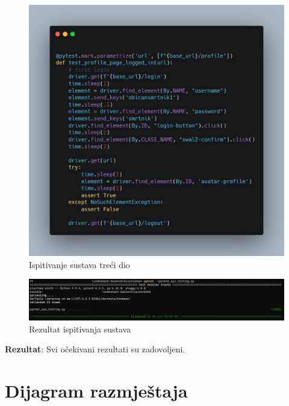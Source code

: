 			\begin{figure}[H]
				\includegraphics[width=\textwidth]{slike/IspitivanjeSustavaTreciDio.png} %
				\caption{Ispitivanje sustava treći dio}
				\label{fig:IspitivanjeSustavaTrećoDio} %
			\end{figure}
			
			\begin{figure}[H]
				\includegraphics[width=\textwidth]{slike/IspitivanjeSustavaRez.png} %
				\caption{Rezultat ispitivanja sustava}
				\label{fig:IspitivanjeSustavaRez} %
			\end{figure}
			
			\noindent  \textbf{Rezultat}: \newline
			Svi očekivani rezultati su zadovoljeni.
			 
			 
			
			\eject 
		
		
		\section{Dijagram razmještaja}
			
